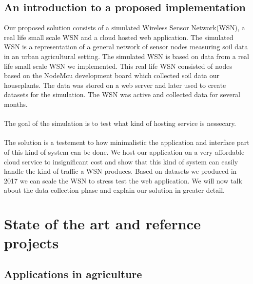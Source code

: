 \documentclass[]{uiophd}
\begin{document}
\section{An introduction to a proposed implementation}
Our proposed solution consists of a simulated Wireless Sensor Network(WSN), a real life small scale WSN and a cloud hosted web application. The simulated WSN is a representation of a general network of sensor nodes measuring soil data in an urban agricultural setting. The simulated WSN is based on data from a real life small scale WSN we implemented. This real life WSN consisted of nodes based on the NodeMcu development board which collected soil data our houseplants. The data was stored on a web server and later used to create datasets for the simulation. The WSN was active and collected data for several months. 
\\\\
The goal of the simulation is to test what kind of hosting service is nessecary.
\\\\
The solution is a testement to how minimalistic the application and interface part of this kind of system can be done. We host our application on a very affordable cloud service to insignificant cost and show that this kind of system can easily handle the kind of traffic a WSN produces. Based on datasets we produced in 2017 we can scale the WSN to stress test the web application. We will now talk about the data collection phase and explain our solution in greater detail.

\chapter{State of the art and refernce projects}

\section{Applications in agriculture}
\end{document}
